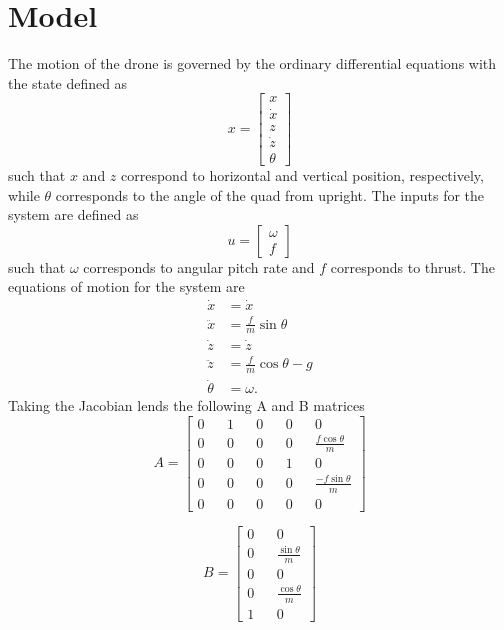 \documentclass[12pt]{article}
\begin{document}
	\section{Model}
	The motion of the drone is governed by the ordinary differential equations with the state defined as
	\begin{equation}
		\label{state}
		x = \begin{bmatrix} x\\ \dot{x} \\ z \\ \dot{z} \\ \theta \end{bmatrix}
	\end{equation}
	such that $x$ and $z$ correspond to horizontal and vertical position, respectively, while $\theta$ corresponds to the angle of the quad from upright. The inputs for the system are defined as
	\begin{equation}
		\label{inputs}
		u = \begin{bmatrix} \omega \\ f \end{bmatrix}
	\end{equation}
	such that $\omega$ corresponds to angular pitch rate and $f$ corresponds to thrust.  The equations of motion for the system are
	\begin{align*}
		\dot{x} &= \dot{x} \\
		\ddot{x} &= \frac{f}{m}\sin\theta \\
		\dot{z} &= \dot{z} \\
		\ddot{z} &= \frac{f}{m}\cos\theta - g\\
		\dot{\theta} &= \omega.
	\end{align*}
	Taking the Jacobian lends the following A and B matrices 
	\begin{equation}
		\label{A_matrix}
		A = \begin{bmatrix} 0 && 1 && 0 && 0 && 0 \\ 0 && 0 && 0 && 0 && \frac{f\cos{\theta}}{m} \\  0 && 0 && 0 && 1 && 0 \\ 0 && 0 && 0 && 0 && \frac{-f\sin{\theta}}{m} \\ 0 && 0 && 0 && 0 && 0 \end{bmatrix}
	\end{equation}
	
	\begin{equation}
		\label{B_matrix}
		B = \begin{bmatrix} 0 && 0 \\ 0 && \frac{\sin{\theta}}{m} \\ 0 && 0 \\ 0 && \frac{\cos{\theta}}{m} \\ 1 && 0 \end{bmatrix}
	\end{equation}
	
\end{document}

